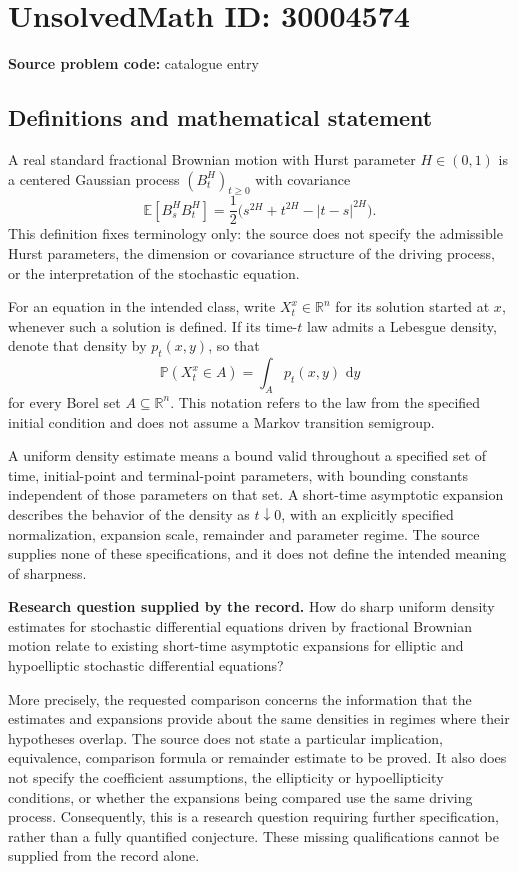 \documentclass[11pt]{article}
\newcommand{\R}{\mathbb{R}}
\newcommand{\E}{\mathbb{E}}
\newcommand{\dd}{\,\mathrm{d}}
\begin{document}
\section*{UnsolvedMath ID: 30004574}
\textbf{Source problem code:} catalogue entry
\subsection{Definitions and mathematical statement}
A real standard fractional Brownian motion with Hurst parameter \(H\in(0,1)\) is a centered Gaussian process \((B_t^H)_{t\geq0}\) with covariance
\[
\E[B_s^H B_t^H]=\frac12\bigl(s^{2H}+t^{2H}-|t-s|^{2H}\bigr).
\]
This definition fixes terminology only: the source does not specify the admissible Hurst parameters, the dimension or covariance structure of the driving process, or the interpretation of the stochastic equation.

For an equation in the intended class, write \(X_t^x\in\R^n\) for its solution started at \(x\), whenever such a solution is defined. If its time-\(t\) law admits a Lebesgue density, denote that density by \(p_t(x,y)\), so that
\[
\mathbb P(X_t^x\in A)=\int_A p_t(x,y)\,\dd y
\]
for every Borel set \(A\subseteq\R^n\). This notation refers to the law from the specified initial condition and does not assume a Markov transition semigroup.

A uniform density estimate means a bound valid throughout a specified set of time, initial-point and terminal-point parameters, with bounding constants independent of those parameters on that set. A short-time asymptotic expansion describes the behavior of the density as \(t\downarrow0\), with an explicitly specified normalization, expansion scale, remainder and parameter regime. The source supplies none of these specifications, and it does not define the intended meaning of sharpness.

\textbf{Research question supplied by the record.} How do sharp uniform density estimates for stochastic differential equations driven by fractional Brownian motion relate to existing short-time asymptotic expansions for elliptic and hypoelliptic stochastic differential equations?

More precisely, the requested comparison concerns the information that the estimates and expansions provide about the same densities in regimes where their hypotheses overlap. The source does not state a particular implication, equivalence, comparison formula or remainder estimate to be proved. It also does not specify the coefficient assumptions, the ellipticity or hypoellipticity conditions, or whether the expansions being compared use the same driving process. Consequently, this is a research question requiring further specification, rather than a fully quantified conjecture. These missing qualifications cannot be supplied from the record alone.
\end{document}
